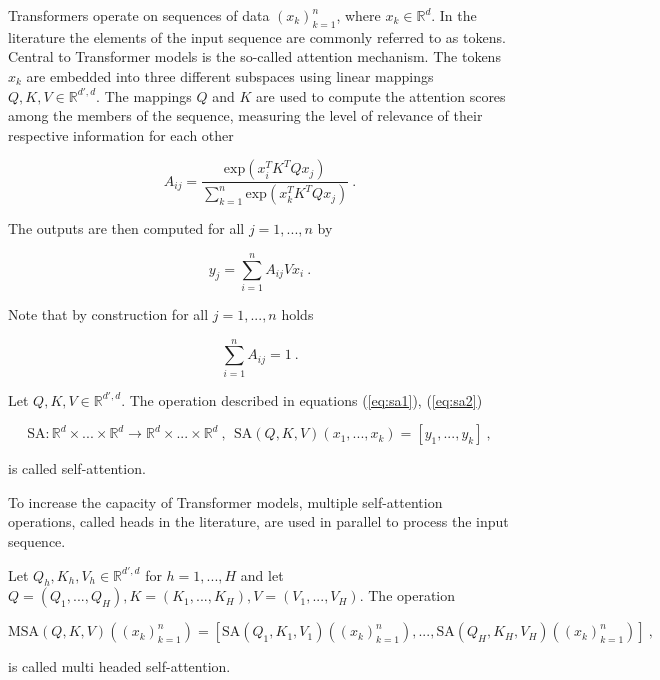 Transformers operate on sequences of data $(x_{k})_{k=1}^n$, where $x_{k} \in \mathbb R^d$.
In the literature the elements of the input sequence are commonly referred to as tokens.
Central to Transformer models is the so-called attention mechanism.
The tokens $x_k$ are embedded into three different subspaces using linear mappings $Q, K, V \in \mathbb R^{d', d}$.
The mappings $Q$ and $K$ are used to compute the attention scores among the members of the sequence,
measuring the level of relevance of their respective information for each other

    \begin{equation} \label{eq:sa1}
        A_{ij} = \frac{\text{exp}(x_{i}^T K^T Q x_{j})}{\sum_{k = 1}^n \text{exp}(x_{k}^T K^T Q x_{j})} ~.
    \end{equation}

The outputs are then computed for all $j=1, ..., n$ by 

    \begin{equation} \label{eq:sa2}
        y_{j} = \sum_{i=1}^n A_{ij} V x_{i} ~.
    \end{equation}

Note that by construction for all $j = 1,..., n$ holds

    $$ \sum_{i=1}^n A_{ij} = 1 ~. $$

\begin{definition}
    Let $Q, K, V \in \mathbb R^{d', d}$.
    The operation described in equations (\ref{eq:sa1}), (\ref{eq:sa2}) 

        $$ \text{SA}: \mathbb R^{d} \times ... \times \mathbb R^{d} \to \mathbb R^{d} \times ... \times \mathbb R^{d} ~, ~~ \text{SA} (Q, K, V)(x_1, ..., x_k) = [y_1, ..., y_k] ~, $$

    is called self-attention.
\end{definition}

To increase the capacity of Transformer models, multiple self-attention operations, 
called heads in the literature, are used in parallel to process the input sequence.

\begin{definition}
    Let $Q_h, K_h, V_h \in \mathbb R^{d', d}$ for $h= 1,..., H$ and let $Q = (Q_1, ..., Q_H), K = (K_1, ..., K_H), V = (V_1, ..., V_H)$.
    The operation

        $$ \text{MSA}(Q, K, V) \left((x_{k})_{k=1}^n \right) = [\text{SA}(Q_1, K_1, V_1)\left((x_{k})_{k=1}^n \right), ..., \text{SA}(Q_H, K_H, V_H)\left((x_{k})_{k=1}^n \right)] ~, $$

    is called multi headed self-attention.
\end{definition}


